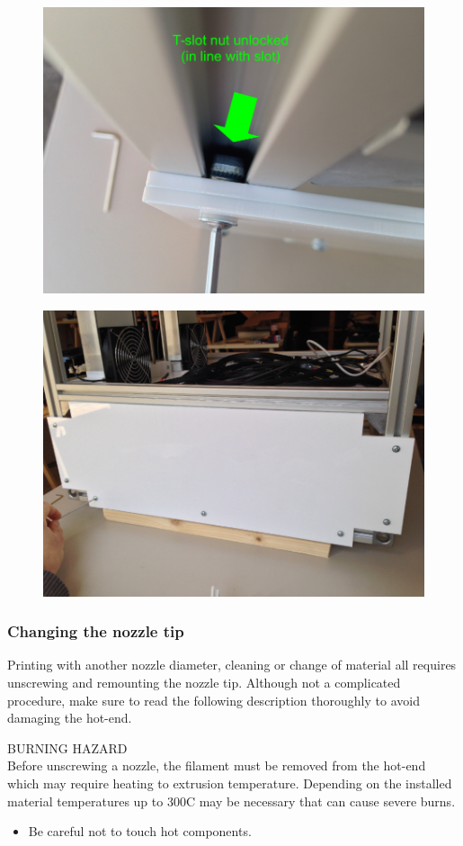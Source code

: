 \begin{figure}[H]
  \centering
  \includegraphics[width=.7\linewidth]{./img/open_electronics_enclosure_-_step5_-_03.png}
\end{figure}

\begin{figure}[H]
  \centering
  \includegraphics[width=.7\linewidth]{./img/open_electronics_enclosure_-_step5_-_01.png}
\end{figure}

\subsubsection{Changing the nozzle tip}

Printing with another nozzle diameter, cleaning or change of material all requires unscrewing and remounting the nozzle tip. Although not a complicated procedure, make sure to read the following description thoroughly to avoid damaging the hot-end. 

\begin{danger}
  BURNING HAZARD\\
  Before unscrewing a nozzle, the filament must be removed from the hot-end which may require heating to extrusion temperature. Depending on the installed material temperatures up to 300\degree C may be necessary that can cause severe burns.

  \begin{itemize}
    \item Be careful not to touch hot components.
  \end{itemize}
\end{danger}

